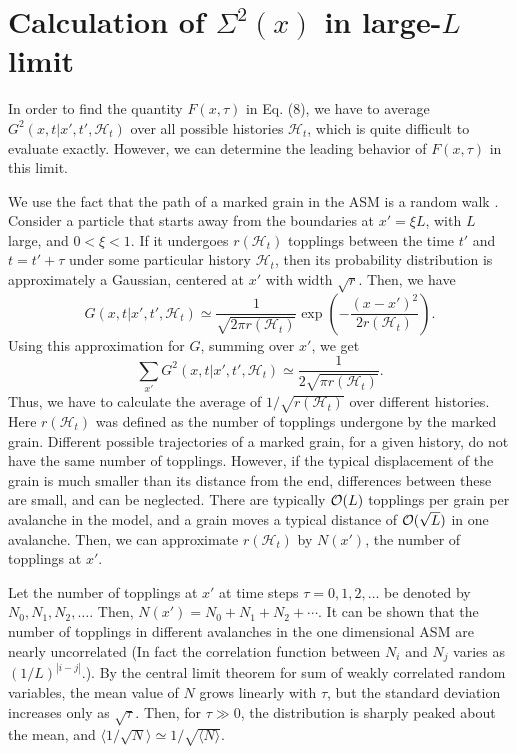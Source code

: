 \documentclass[11pt,a4paper]{book}
\begin{document}
\section{Calculation of $\Sigma^2(x)$ in large-$L$ limit}\label{ch4.4}
In order to find the quantity 
$F(x,\tau)$ in Eq. (8), we have to 
average $ G^2(x,t | x',t',\mathcal{H}_t)$ over all possible histories 
$\mathcal{H}_t$, which is quite difficult to evaluate exactly. 
However, we can determine the leading behavior of $F(x,\tau)$ in this limit. 

We use the fact that the path of a marked grain in the ASM is a random 
walk \cite{punya}.  Consider a particle that starts away from the 
boundaries at $x'= \xi L$, with $L$ large, and $0 < \xi < 1$. If it 
undergoes $r(\mathcal{H}_t)$ topplings between the time $t'$ and $t = t' + 
\tau$ under 
some particular history $\mathcal{H}_t$, then its probability distribution 
is approximately a Gaussian, centered at $x'$ with width $\sqrt{r}$.  
Then, we have 
\begin{equation} 
G(x,t|x',t', \mathcal{H}_t) \simeq  \frac{1}{\sqrt{2 \pi r(\mathcal{H}_t) }} \exp\left( - 
\frac{( x - x')^2} {2 r(\mathcal{H}_t)}\right). 
\end{equation}
Using this approximation for $G$, summing over $x'$, we get
\begin{equation}
  \label{eq:12}
\sum_{x'} G^2(x,t|x',t',\mathcal{H}_t) \simeq \frac{1}{2\sqrt{\pi 
r(\mathcal{H}_t)}}.
\end{equation}
Thus, we have to calculate the average of $1/\sqrt{r(\mathcal{H}_t)}$ over 
different histories. Here $r(\mathcal{H}_t)$ was defined as the number of 
topplings undergone by the marked grain. Different possible 
trajectories of a marked grain, for a given history, do not have the 
same number of topplings. However, if the typical displacement of the 
grain is much smaller than its distance from the end, differences 
between these are small, and can be neglected. There are typically 
${\cal O}(L)$ topplings per grain per avalanche in the model, and a grain moves a 
typical distance of ${\cal O}(\sqrt{L})$ in one avalanche. Then, we can 
approximate $r(\mathcal{H}_t)$ by $N(x')$, the number of topplings at $x'$.

 Let the number of topplings at $x'$ at time steps $\tau = 0, 1 , 2, \ldots$ be 
denoted by $N_0, N_1, N_2, \ldots$. Then, $N(x') = N_0 + N_1 + N_2 + \cdots$.  
It can be shown 
that the number of topplings in 
different avalanches in the one dimensional ASM are nearly uncorrelated (In 
fact the correlation function between $N_i$ and $N_j$ varies as 
$(1/L)^{|i -j|}$.).  By 
the central limit theorem for sum of weakly correlated random variables, 
the  mean value of $N$ grows linearly with $\tau$, but the standard 
deviation increases only as $\sqrt{\tau}$. Then, for $\tau \gg 0$, the 
distribution is sharply peaked about the mean, and $\langle1/\sqrt{N} \rangle \simeq 
1/\sqrt{\langle N \rangle}$. 
\end{document}
